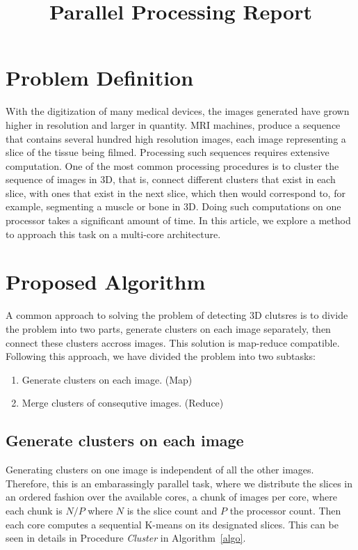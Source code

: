 \documentclass{article}
\begin{document}
	\title{Parallel Processing Report}
	\maketitle
	\section{Problem Definition}
		With the digitization of many medical devices, the images generated have grown higher in resolution and larger in quantity. MRI machines, produce a sequence that contains several hundred high resolution images, each image representing a slice of the tissue being filmed. Processing such sequences requires extensive computation. One of the most common processing procedures is to cluster the sequence of images in 3D, that is, connect different clusters that exist in each slice, with ones that exist in the next slice, which then would correspond to, for example, segmenting a muscle or bone in 3D. Doing such computations on one processor takes a significant amount of time. In this article, we explore a method to approach this task on a multi-core architecture.
	\section{Proposed Algorithm}\label{sec:alg}
		A common approach to solving the problem of detecting 3D clutsres is to divide the problem into two parts, generate clusters on each image separately, then connect these clusters accross images. This solution is map-reduce compatible. Following this approach, we have divided the problem into two subtasks:
		\begin{enumerate}
			\item Generate clusters on each image. (Map) \label{task:1}
			\item Merge clusters of consequtive images. (Reduce) \label{task:2}
		\end{enumerate}
		\subsection{Generate clusters on each image}
			Generating clusters on one image is independent of all the other images. Therefore, this is an embarassingly parallel task, where we distribute the slices in an ordered fashion over the available cores, a chunk of images per core, where each chunk is $N/P$ where $N$ is the slice count and $P$ the processor count. Then each core computes a sequential K-means on its designated slices. This can be seen in details in Procedure \textit{Cluster} in Algorithm~\ref{algo}.
\end{document}
